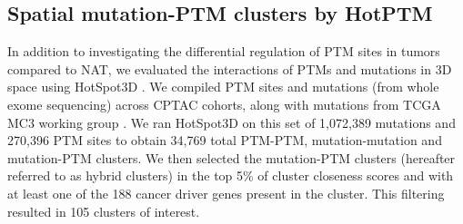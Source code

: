 \subsection{Spatial mutation-PTM clusters by HotPTM}
In addition to investigating the differential regulation of PTM sites in tumors compared to NAT, we evaluated the interactions of PTMs and mutations in 3D space using HotSpot3D \cite{huangk_dingl:SpatiallyInteracting2021,niub_dingl:ProteinstructureguidedDiscovery2016}. We compiled PTM sites and mutations (from whole exome sequencing) across CPTAC cohorts, along with mutations from TCGA MC3 working group \cite{ellrottk_tcga:MC3MutationCalling2018}. We ran HotSpot3D on this set of 1,072,389 mutations and 270,396 PTM sites to obtain 34,769 total PTM-PTM, mutation-mutation and mutation-PTM clusters. We then selected the mutation-PTM clusters (hereafter referred to as hybrid clusters) in the top 5\% of cluster closeness scores and with at least one of the 188 cancer driver genes present in the cluster. This filtering resulted in 105 clusters of interest.

